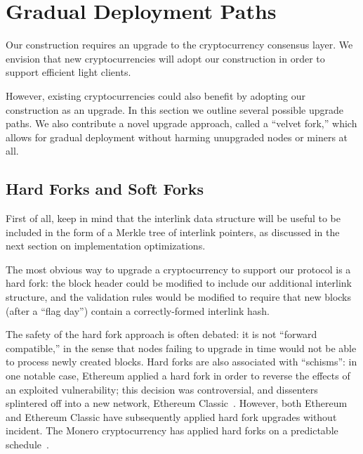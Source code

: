 \section{Gradual Deployment Paths}

\label{sec.forks}
Our construction requires an upgrade to the cryptocurrency consensus layer.
We envision that new cryptocurrencies will adopt our construction in order to support efficient light clients.

However, existing cryptocurrencies could also benefit by adopting our construction as an upgrade.
In this section we outline several possible upgrade paths. We also contribute a novel upgrade approach, called a ``velvet fork,'' which allows for gradual deployment without harming unupgraded nodes or miners at all.

\subsection{Hard Forks and Soft Forks}

First of all, keep in mind that the interlink data structure will be useful to
be included in the form of a Merkle tree of interlink pointers, as discussed in
the next section on implementation optimizations.

The most obvious way to upgrade a cryptocurrency to support our protocol is a
hard fork: the block header could be modified to include our additional
interlink structure, and the validation rules would be modified to require that
new blocks (after a ``flag day'') contain a correctly-formed interlink hash.

The safety of the hard fork approach is often debated: it is not ``forward
compatible,'' in the sense that nodes failing to upgrade in time would not be
able to process newly created blocks. Hard forks are also associated with
``schisms'': in one notable case, Ethereum applied a hard fork in order to
reverse the effects of an exploited vulnerability; this decision was
controversial, and dissenters splintered off into a new network, Ethereum
Classic~\cite{daofork}. However, both Ethereum and Ethereum Classic have
subsequently applied hard fork upgrades without incident. The Monero
cryptocurrency has applied hard forks on a predictable
schedule~\cite{monerohardforks}.

